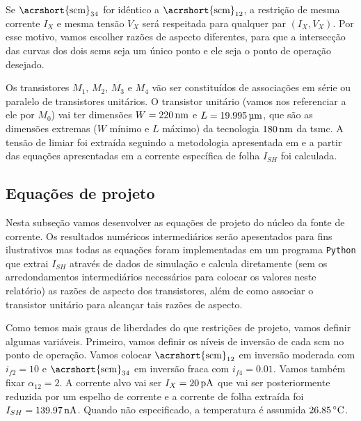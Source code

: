 \documentclass[10pt,a4paper]{extreport}
\newcommand{\?}{\stackrel{?}{=}}
\newcommand{\sis}[2]{\complexnum{#1}\,\si[per-mode=symbol]{#2}}
\begin{document}
Se $\text{\acrshort{scm}}_{34}$ for idêntico a $\text{\acrshort{scm}}_{12}$, a restrição de mesma corrente $I_X$ e mesma tensão $V_X$ será respeitada para qualquer par $(I_X,V_X)$. Por esse motivo, vamos escolher razões de aspecto diferentes, para que a intersecção das curvas dos dois \acrshort{scm}s seja um único ponto e ele seja o ponto de operação desejado.

Os transistores $M_1$, $M_2$, $M_3$ e $M_4$ vão ser constituídos de associações em série ou paralelo de transistores unitários. O transistor unitário (vamos nos referenciar a ele por $M_0$) vai ter dimensões $W=\sis{220}{\nano\meter}$ e $L=\sis{19.995}{\micro\meter}$, que são as dimensões extremas ($W$ mínimo e $L$ máximo) da tecnologia $\sis{180}{\nano\meter}$ da \acrshort{tsmc}. A tensão de limiar foi extraída seguindo a metodologia apresentada em \cite{vt:extract} e a partir das equações apresentadas em \cite{acm:book} a corrente específica de folha $I_{SH}$ foi calculada.

\subsection{Equações de projeto}

Nesta subseção vamos desenvolver as equações de projeto do núcleo da fonte de corrente. Os resultados numéricos intermediários serão apesentados para fins ilustrativos mas todas as equações foram implementadas em um programa \texttt{Python} que extrai $I_{SH}$ através de dados de simulação e calcula diretamente (sem os arredondamentos intermediários necessários para colocar os valores neste relatório) as razões de aspecto dos transistores, além de como associar o transistor unitário para alcançar tais razões de aspecto.

Como temos mais graus de liberdades do que restrições de projeto, vamos definir algumas variáveis. Primeiro, vamos definir os níveis de inversão de cada \acrshort{scm} no ponto de operação. Vamos colocar $\text{\acrshort{scm}}_{12}$ em inversão moderada com $i_{f2}=10$ e $\text{\acrshort{scm}}_{34}$ em inversão fraca com $i_{f4}=\num{0.01}$. Vamos também fixar $\alpha_{12}=2$. A corrente alvo vai ser $I_X=\sis{20}{\pico\ampere}$ que vai ser posteriormente reduzida por um espelho de corrente e a corrente de folha extraída foi $I_{SH}=\sis{139.97}{\nano\ampere}$. Quando não especificado, a temperatura é assumida $\sis{26.85}{\celsius}$.
\end{document}
